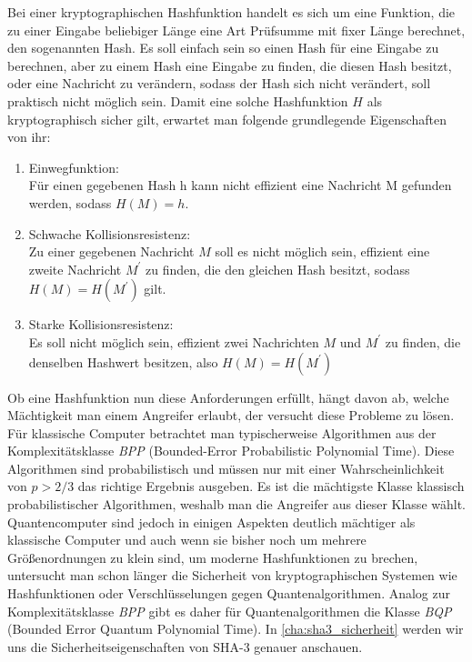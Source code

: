 Bei einer kryptographischen Hashfunktion handelt es sich um eine Funktion, die zu einer Eingabe beliebiger Länge
eine Art Prüfsumme mit fixer Länge berechnet, den sogenannten Hash. 
Es soll einfach sein so einen Hash für eine Eingabe zu berechnen, aber zu einem Hash eine Eingabe zu finden,
die diesen Hash besitzt, oder eine Nachricht zu verändern, sodass der Hash sich nicht verändert, soll praktisch nicht möglich sein.
Damit eine solche Hashfunktion $H$ als kryptographisch sicher gilt, erwartet man folgende grundlegende Eigenschaften von ihr:
\begin{enumerate}
    \item Einwegfunktion:\\
    Für einen gegebenen Hash h kann nicht effizient eine Nachricht M gefunden werden, sodass $H(M) = h$.
	\item Schwache Kollisionsresistenz: \\
    Zu einer gegebenen Nachricht $M$ soll es nicht möglich sein, effizient eine zweite Nachricht $M^\prime$ zu finden,
    die den gleichen Hash besitzt, sodass $H(M) = H(M^\prime)$ gilt.
	\item Starke Kollisionsresistenz: \\
    Es soll nicht möglich sein, effizient zwei Nachrichten $M$ und $M^\prime$ zu finden, die denselben Hashwert besitzen,
    also $H(M) = H(M^\prime)$ \cite{rogaway2004crypto}
\end{enumerate}
Ob eine Hashfunktion nun diese Anforderungen erfüllt, hängt davon ab, welche Mächtigkeit man einem Angreifer erlaubt,
der versucht diese Probleme zu lösen. Für klassische Computer betrachtet man typischerweise Algorithmen aus der Komplexitätsklasse \textit{BPP} (Bounded-Error Probabilistic Polynomial Time).
Diese Algorithmen sind probabilistisch und müssen nur mit einer Wahrscheinlichkeit von $p > 2/3$ das richtige Ergebnis ausgeben.
Es ist die mächtigste Klasse klassisch probabilistischer Algorithmen, weshalb man die Angreifer aus dieser Klasse wählt.
Quantencomputer sind jedoch in einigen Aspekten deutlich mächtiger als klassische Computer und auch wenn sie bisher
noch um mehrere Größenordnungen zu klein sind, um moderne Hashfunktionen zu brechen, untersucht man schon länger die Sicherheit
von kryptographischen Systemen wie Hashfunktionen oder Verschlüsselungen gegen Quantenalgorithmen. Analog zur Komplexitätsklasse \textit{BPP}
gibt es daher für Quantenalgorithmen die Klasse \textit{BQP} (Bounded Error Quantum Polynomial Time). In \ref{cha:sha3_sicherheit} werden wir uns die
Sicherheitseigenschaften von SHA-3 genauer anschauen. \\


